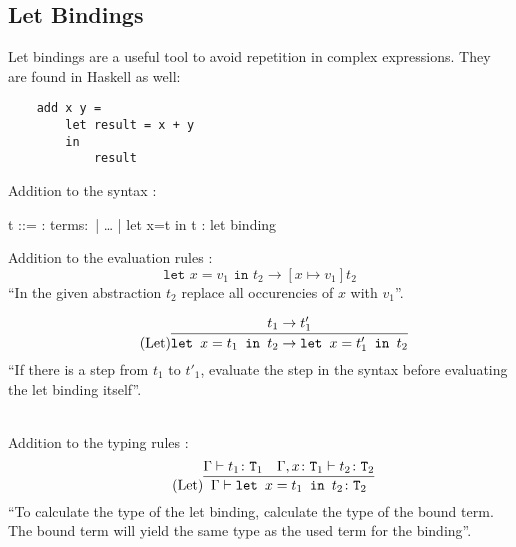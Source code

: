 \subsection{Let Bindings}
\label{subsec:let}

Let bindings are a useful tool to avoid repetition in complex expressions.
They are found in Haskell as well:

\begin{verbatim}
    add x y =
        let result = x + y
        in
            result
\end{verbatim}

Addition to the syntax \cite{pierce2002ProgLang}:
\begin{bnfgrammar}
    t ::= : terms$\colon$
    | \dots
    | let x=t in t : let binding
\end{bnfgrammar}\leavevmode\newline

Addition to the evaluation rules \cite{pierce2002ProgLang}:
\begin{equation*}
    \tag{Let-Bind Value}
    \texttt{let } x=v_1 \texttt{ in } t_2 \rightarrow [x \mapsto v_1] t_2
\end{equation*}
``In the given abstraction $t_2$ replace all occurencies of $x$ with $v_1$''.

\begin{equation*}
    \tag{Let}
    \infer{
        \texttt{let } x=t_1 \texttt{ in } t_2 \rightarrow \texttt{let } x=t'_1 \texttt{ in } t_2
    }{
        t_1 \rightarrow t'_1
    }
\end{equation*}
``If there is a step from $t_1$ to $t'_1$, evaluate the step
in the syntax before evaluating the let binding itself''.

~\\
Addition to the typing rules \cite{pierce2002ProgLang}:
\begin{equation*}
    \tag{Let}
    \infer{
        \Gamma \vdash \texttt{let } x=t_1 \texttt{ in } t_2 \colon \texttt{T}_2
    }{
        \Gamma \vdash t_1 \colon \texttt{T}_1 & \Gamma , x \colon \texttt{T}_1 \vdash t_2 \colon \texttt{T}_2
    }
\end{equation*}
``To calculate the type of the let binding, calculate the type of the bound term. The bound
term will yield the same type as the used term for the binding''.
